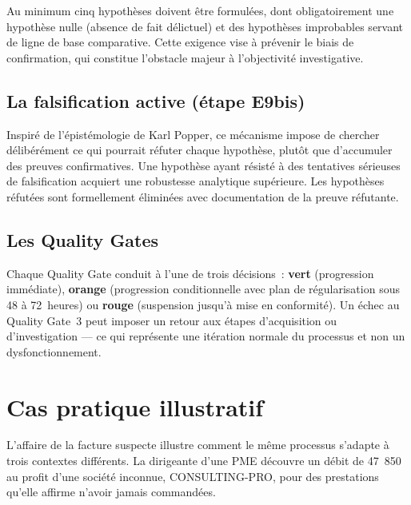 \documentclass[11pt, a4paper]{article}
\begin{document}
Au minimum cinq hypoth\`{e}ses doivent \^{e}tre formul\'{e}es, dont
obligatoirement une hypoth\`{e}se nulle (absence de fait d\'{e}lictuel) et des
hypoth\`{e}ses improbables servant de ligne de base comparative. Cette exigence
vise \`{a} pr\'{e}venir le biais de confirmation, qui constitue l'obstacle majeur
\`{a} l'objectivit\'{e} investigative.

\subsection{La falsification active (étape E9bis)}

Inspir\'{e} de l'\'{e}pist\'{e}mologie de Karl Popper, ce m\'{e}canisme impose de
chercher d\'{e}lib\'{e}r\'{e}ment ce qui pourrait r\'{e}futer chaque hypoth\`{e}se,
plut\^{o}t que d'accumuler des preuves confirmatives. Une hypoth\`{e}se ayant
r\'{e}sist\'{e} \`{a} des tentatives s\'{e}rieuses de falsification acquiert une
robustesse analytique sup\'{e}rieure. Les hypoth\`{e}ses r\'{e}fut\'{e}es sont
formellement \'{e}limin\'{e}es avec documentation de la preuve r\'{e}futante.

\subsection{Les Quality Gates}

Chaque Quality Gate conduit \`{a} l'une de trois d\'{e}cisions~:
\textcolor{green!55!black}{\textbf{vert}} (progression imm\'{e}diate),
\textcolor{orange!85!black}{\textbf{orange}} (progression conditionnelle avec plan
de r\'{e}gularisation sous 48 \`{a} 72~heures) ou
\textcolor{red!70!black}{\textbf{rouge}} (suspension jusqu'\`{a} mise en
conformit\'{e}). Un \'{e}chec au Quality Gate~3 peut imposer un retour aux
\'{e}tapes d'acquisition ou d'investigation --- ce qui repr\'{e}sente une
it\'{e}ration normale du processus et non un dysfonctionnement.

\section{Cas pratique illustratif}

L'affaire de la facture suspecte illustre comment le m\^{e}me processus s'adapte
\`{a} trois contextes diff\'{e}rents. La dirigeante d'une PME d\'{e}couvre un d\'{e}bit
de 47~850~\texteuro{} au profit d'une soci\'{e}t\'{e} inconnue, CONSULTING-PRO, pour des
prestations qu'elle affirme n'avoir jamais command\'{e}es.
\end{document}

